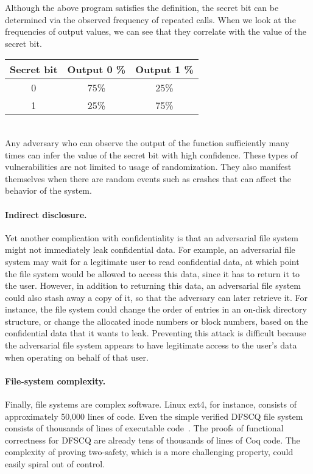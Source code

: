 Although the above program satisfies the definition, the secret bit can be determined via the observed frequency of repeated calls. When we look at the frequencies of output values, we can see that they correlate with the value of the secret bit. \\

\begin{tabular}{| c | c | c |}
	\hline
	Secret bit & Output 0 \% & Output 1 \% \\
	\hline
	0 &	75\% & 25\% \\
	\hline
	1 &	25\% & 75\% \\
	\hline
\end{tabular}\\

Any adversary who can observe the output of the function sufficiently many times can infer the value of the secret bit with high confidence. These types of vulnerabilities are not limited to usage of randomization. They also manifest themselves when there are random events such as crashes that can affect the behavior of the system.


\paragraph{Indirect disclosure.}
Yet another complication with confidentiality is that an adversarial
file system might not immediately leak confidential data.  For example,
an adversarial file system may wait for a legitimate user to read
confidential data, at which point the file system would be allowed to
access this data, since it has to return it to the user.  However, in
addition to returning this data, an adversarial file system could also
stash away a copy of it, so that the adversary can later retrieve it.
For instance, the file system could change the order of entries in an
on-disk directory structure, or change the allocated inode numbers or
block numbers, based on the confidential data that it wants to leak.
Preventing this attack is difficult because the adversarial file system
appears to have legitimate access to the user's data when operating on
behalf of that user.

\paragraph{File-system complexity.}
Finally, file systems are complex software.  Linux ext4, for
instance, consists of approximately 50,000 lines of code.  Even the simple
verified DFSCQ file system consists of thousands of lines of executable
code~\cite{chen:dfscq}.  The proofs of functional correctness for DFSCQ
are already tens of thousands of lines of Coq code.  The complexity of
proving two-safety, which is a more challenging property, could easily
spiral out of control.
